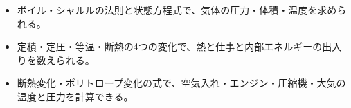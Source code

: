 \makeatletter
\newcommand\qxdbag[4]{\begin{scope}[shift={#1}]
  \filldraw[fill=bkOrange!25, draw=bkOrange!70!black, line width=0.8pt, rounded corners=#4 mm]
    (-#2/2,-#3/2) rectangle (#2/2,#3/2);
  \fill[bkOrange!55] (-#2/2,#3/2-2) rectangle (#2/2,#3/2);
  \fill[bkOrange!55] (-#2/2,-#3/2) rectangle (#2/2,-#3/2+2);
\end{scope}}
\newcommand\qxdcyl[4]{\begin{scope}[shift={#1}]
  \fill[bkBlue!12] (0,0) rectangle (#4,#3);
  \draw[bkInk, line width=1pt] (#2,0) -- (0,0) -- (0,#3) -- (#2,#3);
  \filldraw[fill=bkGray!55, draw=bkInk, line width=0.7pt] (#4,-0.6) rectangle (#4+3,#3+0.6);
  \filldraw[fill=bkGray!55, draw=bkInk, line width=0.6pt] (#4+3,#3/2-1) rectangle (#2+6,#3/2+1);
\end{scope}}
\makeatother
{}


\begin{goal}
\begin{itemize}[label={\color{bkTheme}●}, leftmargin=1.6\zw, itemsep=0pt, topsep=1pt]
\item {}\enspace ボイル・シャルルの法則と状態方程式で、気体の圧力・体積・温度を求められる。
\item {}\enspace 定積・定圧・等温・断熱の4つの変化で、熱と仕事と内部エネルギーの出入りを数えられる。
\item {}\enspace 断熱変化・ポリトロープ変化の式で、空気入れ・エンジン・圧縮機・大気の温度と圧力を計算できる。
\end{itemize}
\end{goal}

